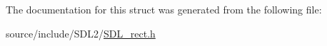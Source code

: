 The documentation for this struct was generated from the following file\+:\begin{DoxyCompactItemize}
\item 
source/include/\+S\+D\+L2/\hyperlink{_s_d_l__rect_8h}{S\+D\+L\+\_\+rect.\+h}\end{DoxyCompactItemize}
